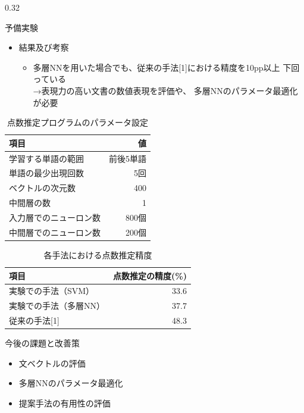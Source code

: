 \documentclass[10pt,unicode]{beamer}
\newcommand{\columnsize}{0.32}
\newcommand{\tablefontsize}{\small}
\newcommand{\itemtitle}[1]{{\normalsize #1} \\}
\newcommand{\arrow}{{\color{ttiblue} →}\hspace{1ex}}
\begin{document}
\begin{frame}{}
\begin{columns}[t]
\begin{column}{\columnsize\textwidth}
\begin{block}{予備実験}
\begin{itemize}
      \item \itemtitle{結果及び考察}
      \begin{itemize}
        \item 多層NNを用いた場合でも、従来の手法[1]における精度を10pp以上
          下回っている \\
          \arrow 表現力の高い文書の数値表現を評価や、
          多層NNのパラメータ最適化が必要
      \end{itemize}
    \end{itemize}

    \begin{table}
    \tablefontsize
    \caption{点数推定プログラムのパラメータ設定}
    \label{table:parameters}
    \begin{tabular}{l | r}
    項目 & 値 \\
    \hline
    学習する単語の範囲 & 前後5単語 \\
    単語の最少出現回数 & 5回 \\
    ベクトルの次元数 & 400 \\
    中間層の数 & 1 \\
    入力層でのニューロン数 & 800個 \\
    中間層でのニューロン数 & 200個
    \end{tabular}
    \end{table}

    \begin{table}
    \tablefontsize
    \caption{各手法における点数推定精度}
    \begin{tabular}{l | r}
    項目 & 点数推定の精度(\%) \\
    \hline
    実験での手法（SVM）& 33.6 \\
    実験での手法（多層NN）& 37.7 \\
    従来の手法[1] & 48.3
    \end{tabular}
    \end{table}
  \end{block} %

  \begin{block}{今後の課題と改善策}
    \begin{itemize}
      \item 文ベクトルの評価
      \item 多層NNのパラメータ最適化
      \item 提案手法の有用性の評価
    \end{itemize}
  \end{block} %


\end{column}
\end{columns}
\end{frame}
\end{document}
